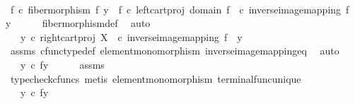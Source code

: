 \begin{isabellebody}
%
\isatagproof
{}\isamarkupfalse%
\ {\isacharminus}{\kern0pt}\isanewline
\ \ \isamarkupfalse%
\ {\isachardoublequoteopen}f\ {\isasymcirc}\isactrlsub c\ fiber{\isacharunderscore}{\kern0pt}morphism\ f\ y\ {\isacharequal}{\kern0pt}\ f\ {\isasymcirc}\isactrlsub c\ left{\isacharunderscore}{\kern0pt}cart{\isacharunderscore}{\kern0pt}proj\ {\isacharparenleft}{\kern0pt}domain\ f{\isacharparenright}{\kern0pt}\ {\isasymone}\ {\isasymcirc}\isactrlsub c\ inverse{\isacharunderscore}{\kern0pt}image{\isacharunderscore}{\kern0pt}mapping\ f\ {\isasymone}\ y{\isachardoublequoteclose}\isanewline
\ \ \ \ \isamarkupfalse%
\ fiber{\isacharunderscore}{\kern0pt}morphism{\isacharunderscore}{\kern0pt}def\ \isamarkupfalse%
\ auto\isanewline
\ \ \isamarkupfalse%
\ \isamarkupfalse%
\ {\isachardoublequoteopen}{\isachardot}{\kern0pt}{\isachardot}{\kern0pt}{\isachardot}{\kern0pt}\ {\isacharequal}{\kern0pt}\ y\ {\isasymcirc}\isactrlsub c\ right{\isacharunderscore}{\kern0pt}cart{\isacharunderscore}{\kern0pt}proj\ X\ {\isasymone}\ {\isasymcirc}\isactrlsub c\ inverse{\isacharunderscore}{\kern0pt}image{\isacharunderscore}{\kern0pt}mapping\ f\ {\isasymone}\ y{\isachardoublequoteclose}\isanewline
\ \ \ \ \isamarkupfalse%
\ assms\ cfunc{\isacharunderscore}{\kern0pt}type{\isacharunderscore}{\kern0pt}def\ element{\isacharunderscore}{\kern0pt}monomorphism\ inverse{\isacharunderscore}{\kern0pt}image{\isacharunderscore}{\kern0pt}mapping{\isacharunderscore}{\kern0pt}eq\ \isamarkupfalse%
\ auto\isanewline
\ \ \isamarkupfalse%
\ \isamarkupfalse%
\ {\isachardoublequoteopen}{\isachardot}{\kern0pt}{\isachardot}{\kern0pt}{\isachardot}{\kern0pt}\ {\isacharequal}{\kern0pt}\ y\ {\isasymcirc}\isactrlsub c\ {\isasymbeta}\isactrlbsub f\isactrlsup {\isacharminus}{\kern0pt}\isactrlbsub y\isactrlesub \isactrlesub {\isachardoublequoteclose}\isanewline
\ \ \ \ \isamarkupfalse%
\ assms\ \isamarkupfalse%
\ {\isacharparenleft}{\kern0pt}typecheck{\isacharunderscore}{\kern0pt}cfuncs{\isacharcomma}{\kern0pt}\ metis\ element{\isacharunderscore}{\kern0pt}monomorphism\ terminal{\isacharunderscore}{\kern0pt}func{\isacharunderscore}{\kern0pt}unique{\isacharparenright}{\kern0pt}\isanewline
\ \ \isamarkupfalse%
\ \isamarkupfalse%
\ {\isachardoublequoteopen}{\isachardot}{\kern0pt}{\isachardot}{\kern0pt}{\isachardot}{\kern0pt}\ {\isacharequal}{\kern0pt}\ y\ {\isasymcirc}\isactrlsub c\ {\isasymbeta}\isactrlbsub f\isactrlsup {\isacharminus}{\kern0pt}y{\isacharbraceright}{\kern0pt}\isactrlesub {\isachardoublequoteclose}\isanewline

\end{isabellebody}
